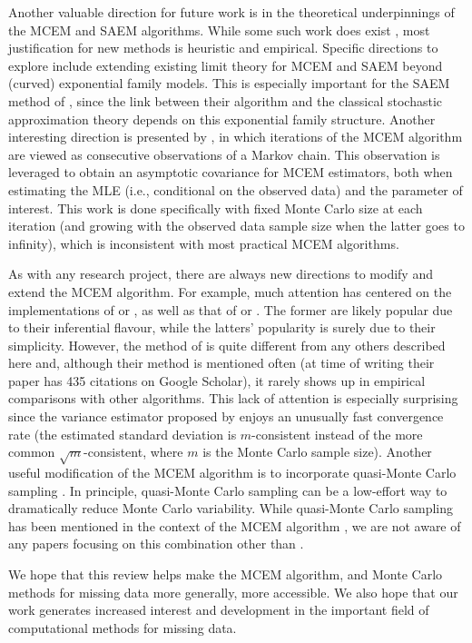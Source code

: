 \documentclass[11pt, oneside]{article}   	%
\begin{document}
Another valuable direction for future work is in the theoretical underpinnings of the MCEM and SAEM algorithms. While some such work does exist \citep[e.g.,][]{Del99, For03}, most justification for new methods is heuristic and empirical. Specific directions to explore include extending existing limit theory for MCEM and SAEM beyond (curved) exponential family models. This is especially important for the SAEM method of \citet{Del99}, since the link between their algorithm and the classical stochastic approximation theory depends on this exponential family structure. Another interesting direction is presented by \citet{Nie00}, in which iterations of the MCEM algorithm are viewed as consecutive observations of a Markov chain. This observation is leveraged to obtain an asymptotic covariance for MCEM estimators, both when estimating the MLE (i.e., conditional on the observed data) and the parameter of interest. This work is done specifically with fixed Monte Carlo size at each iteration (and growing with the observed data sample size when the latter goes to infinity), which is inconsistent with most practical MCEM algorithms.

As with any research project, there are always new directions to modify and extend the MCEM algorithm. For example, much attention has centered on the implementations of \citet{Boo99} or \citet{Caf05}, as well as that of \citet{Wei90} or \citet{McC97}. The former are likely popular due to their inferential flavour, while the latters' popularity is surely due to their simplicity. However, the method of \citet{Cha95} is quite different from any others described here and, although their method is mentioned often (at time of writing their paper has 435 citations on Google Scholar), it rarely shows up in empirical comparisons with other algorithms. This lack of attention is especially surprising since the variance estimator proposed by \citeauthor{Cha95} enjoys an unusually fast convergence rate (the estimated standard deviation is $m$-consistent instead of the more common $\sqrt{m}$-consistent, where $m$ is the Monte Carlo sample size). Another useful modification of the MCEM algorithm is to incorporate quasi-Monte Carlo sampling \citep[see][]{Jan05}. In principle, quasi-Monte Carlo sampling can be a low-effort way to dramatically reduce Monte Carlo variability. While quasi-Monte Carlo sampling has been mentioned in the context of the MCEM algorithm \citet{Kuo08}, we are not aware of any papers focusing on this combination other than \citet{Jan05}.

We hope that this review helps make the MCEM algorithm, and Monte Carlo methods for missing data more generally, more accessible. We also hope that our work generates increased interest and development in the important field of computational methods for missing data.
\end{document}
